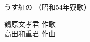 \documentclass[10pt,b5j]{tarticle} %
\begin{document}
\begin{minipage}[c]{0.7\hsize} %
    \begin{center}
        {\LARGE
            うす紅の %
        }
        {\small 
            （昭和54年寮歌） %
        }
    \end{center}
\end{minipage}
\begin{minipage}[c]{0.3\hsize} %
    \begin{flushright} %
        鶴原文孝君 作歌\\高田和重君 作曲 %
    \end{flushright}
\end{minipage}
\end{document}
